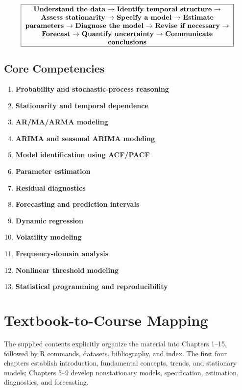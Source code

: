 \documentclass[11pt,a4paper]{article}
\begin{document}
\[
\boxed{
\begin{minipage}{0.88\textwidth}
\centering
\textbf{Understand the data}
$\rightarrow$
\textbf{Identify temporal structure}
$\rightarrow$
\textbf{Assess stationarity}
$\rightarrow$
\textbf{Specify a model}
$\rightarrow$
\textbf{Estimate parameters}
$\rightarrow$
\textbf{Diagnose the model}
$\rightarrow$
\textbf{Revise if necessary}
$\rightarrow$
\textbf{Forecast}
$\rightarrow$
\textbf{Quantify uncertainty}
$\rightarrow$
\textbf{Communicate conclusions}
\end{minipage}
}
\]

\subsection{Core Competencies}

\begin{enumerate}
    \item \textbf{Probability and stochastic-process reasoning}
    \item \textbf{Stationarity and temporal dependence}
    \item \textbf{AR/MA/ARMA modeling}
    \item \textbf{ARIMA and seasonal ARIMA modeling}
    \item \textbf{Model identification using ACF/PACF}
    \item \textbf{Parameter estimation}
    \item \textbf{Residual diagnostics}
    \item \textbf{Forecasting and prediction intervals}
    \item \textbf{Dynamic regression}
    \item \textbf{Volatility modeling}
    \item \textbf{Frequency-domain analysis}
    \item \textbf{Nonlinear threshold modeling}
    \item \textbf{Statistical programming and reproducibility}
\end{enumerate}

\section{Textbook-to-Course Mapping}

The supplied contents explicitly organize the material into Chapters 1--15,
followed by R commands, datasets, bibliography, and index. The first four
chapters establish introduction, fundamental concepts, trends, and stationary
models; Chapters 5--9 develop nonstationary models, specification, estimation,
diagnostics, and forecasting. 
\end{document}
